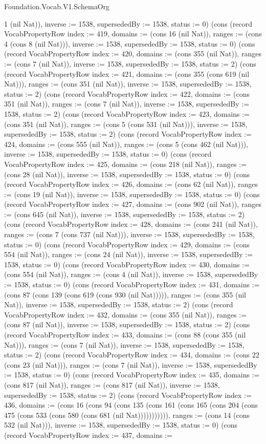 \begin{lexlean}{Foundation.Vocab.V1.SchemaOrg}
\begin{semanticmodule}
{1 (nil Nat)), inverse := 1538, supersededBy := 1538, status := 0}) (cons (record VocabPropertyRow {index := 419, domains := (cons 16 (nil Nat)), ranges := (cons 4 (cons 8 (nil Nat))), inverse := 1538, supersededBy := 1538, status := 0}) (cons (record VocabPropertyRow {index := 420, domains := (cons 355 (nil Nat)), ranges := (cons 7 (nil Nat)), inverse := 1538, supersededBy := 1538, status := 2}) (cons (record VocabPropertyRow {index := 421, domains := (cons 355 (cons 619 (nil Nat))), ranges := (cons 351 (nil Nat)), inverse := 1538, supersededBy := 1538, status := 2}) (cons (record VocabPropertyRow {index := 422, domains := (cons 351 (nil Nat)), ranges := (cons 7 (nil Nat)), inverse := 1538, supersededBy := 1538, status := 2}) (cons (record VocabPropertyRow {index := 423, domains := (cons 351 (nil Nat)), ranges := (cons 5 (cons 531 (nil Nat))), inverse := 1538, supersededBy := 1538, status := 2}) (cons (record VocabPropertyRow {index := 424, domains := (cons 555 (nil Nat)), ranges := (cons 5 (cons 462 (nil Nat))), inverse := 1538, supersededBy := 1538, status := 0}) (cons (record VocabPropertyRow {index := 425, domains := (cons 218 (nil Nat)), ranges := (cons 28 (nil Nat)), inverse := 1538, supersededBy := 1538, status := 0}) (cons (record VocabPropertyRow {index := 426, domains := (cons 62 (nil Nat)), ranges := (cons 19 (nil Nat)), inverse := 1538, supersededBy := 1538, status := 0}) (cons (record VocabPropertyRow {index := 427, domains := (cons 902 (nil Nat)), ranges := (cons 645 (nil Nat)), inverse := 1538, supersededBy := 1538, status := 2}) (cons (record VocabPropertyRow {index := 428, domains := (cons 241 (nil Nat)), ranges := (cons 7 (cons 737 (nil Nat))), inverse := 1538, supersededBy := 1538, status := 0}) (cons (record VocabPropertyRow {index := 429, domains := (cons 554 (nil Nat)), ranges := (cons 24 (nil Nat)), inverse := 1538, supersededBy := 1538, status := 0}) (cons (record VocabPropertyRow {index := 430, domains := (cons 554 (nil Nat)), ranges := (cons 4 (nil Nat)), inverse := 1538, supersededBy := 1538, status := 0}) (cons (record VocabPropertyRow {index := 431, domains := (cons 87 (cons 139 (cons 619 (cons 930 (nil Nat))))), ranges := (cons 355 (nil Nat)), inverse := 1538, supersededBy := 1538, status := 2}) (cons (record VocabPropertyRow {index := 432, domains := (cons 355 (nil Nat)), ranges := (cons 87 (nil Nat)), inverse := 1538, supersededBy := 1538, status := 2}) (cons (record VocabPropertyRow {index := 433, domains := (cons 88 (cons 355 (nil Nat))), ranges := (cons 7 (nil Nat)), inverse := 1538, supersededBy := 1538, status := 2}) (cons (record VocabPropertyRow {index := 434, domains := (cons 22 (cons 23 (nil Nat))), ranges := (cons 7 (nil Nat)), inverse := 1538, supersededBy := 1538, status := 0}) (cons (record VocabPropertyRow {index := 435, domains := (cons 817 (nil Nat)), ranges := (cons 817 (nil Nat)), inverse := 1538, supersededBy := 1538, status := 2}) (cons (record VocabPropertyRow {index := 436, domains := (cons 16 (cons 94 (cons 135 (cons 161 (cons 165 (cons 204 (cons 475 (cons 533 (cons 580 (cons 681 (nil Nat))))))))))), ranges := (cons 14 (cons 532 (nil Nat))), inverse := 1538, supersededBy := 1538, status := 0}) (cons (record VocabPropertyRow {index := 437, domains := }
\end{semanticmodule}
\end{lexlean}
